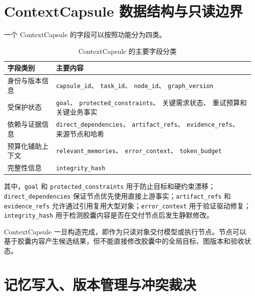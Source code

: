 \documentclass[UTF8,a4paper,12pt,oneside]{ctexbook}
\begin{document}
\section{ContextCapsule 数据结构与只读边界}

一个 ContextCapsule 的字段可以按照功能分为四类。

\begin{table}[htbp]
\centering
\caption{ContextCapsule 的主要字段分类}
\label{tab:capsule-fields}
\begin{tabularx}{0.96\textwidth}{p{}X}
\toprule
字段类别 & 主要内容\\
\midrule

身份与版本信息
&
\texttt{capsule\_id}、
\texttt{task\_id}、
\texttt{node\_id}、
\texttt{graph\_version}\\

受保护状态
&
\texttt{goal}、
\texttt{protected\_constraints}、
关键需求状态、
重试预算和关键业务事实\\

依赖与证据信息
&
\texttt{direct\_dependencies}、
\texttt{artifact\_refs}、
\texttt{evidence\_refs}、
来源节点和哈希\\

预算化辅助上下文
&
\texttt{relevant\_memories}、
\texttt{error\_context}、
\texttt{token\_budget}\\

完整性信息
&
\texttt{integrity\_hash}\\

\bottomrule
\end{tabularx}
\end{table}

其中，\texttt{goal} 和 \texttt{protected\_\allowbreak{}constraints} 用于防止目标和硬约束漂移；\texttt{direct\_\allowbreak{}dependencies} 保证节点优先使用直接上游事实；\texttt{artifact\_\allowbreak{}refs} 和 \texttt{evidence\_\allowbreak{}refs} 允许通过引用复用大型对象；\texttt{error\_\allowbreak{}context} 用于验证驱动修复；\texttt{integrity\_\allowbreak{}hash} 用于检测胶囊内容是否在交付节点后发生静默修改。

ContextCapsule 一旦构造完成，即作为只读对象交付模型或执行节点。节点可以基于胶囊内容产生候选结果，但不能直接修改胶囊中的全局目标、图版本和验收状态。


\section{记忆写入、版本管理与冲突裁决}
\end{document}
